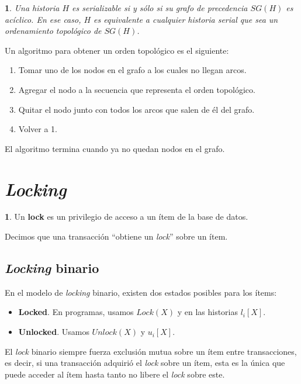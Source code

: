 \documentclass[english]{article}
\newtheorem{thm}{\protect\theoremname}
\theoremstyle{definition}
\theoremstyle{definition}
\newtheorem*{defn*}{\protect\definitionname}
\providecommand{\definitionname}{Definición}
\providecommand{\theoremname}{Teorema}
\begin{document}
\begin{thm}
Una historia $H$ es serializable si y sólo si su grafo de precedencia $SG(H)$
es acíclico. En ese caso, $H$ es equivalente a cualquier historia serial que
sea un ordenamiento topológico de $SG(H)$.
\end{thm}

Un algoritmo para obtener un orden topológico es el siguiente:

\begin{enumerate}
    \item Tomar uno de los nodos en el grafo a los cuales no llegan arcos.
    \item Agregar el nodo a la secuencia que representa el orden topológico.
    \item Quitar el nodo junto con todos los arcos que salen de él del grafo.
    \item Volver a 1.
\end{enumerate}

El algoritmo termina cuando ya no quedan nodos en el grafo.

\section{\emph{Locking}}

\begin{defn*}
Un \textbf{lock} es un privilegio de acceso a un ítem de la base de datos.
\end{defn*}

Decimos que una transacción ``obtiene un \emph{lock}'' sobre un ítem.

\subsection{\emph{Locking} binario}

En el modelo de \emph{locking} binario, existen dos estados posibles para los
ítems:

\begin{itemize}
    \item \textbf{Locked}. En programas, usamos $Lock(X)$ y en las historias
        $l_i[X]$.
    \item \textbf{Unlocked}. Usamos $Unlock(X)$ y $u_i[X]$.
\end{itemize}

El \emph{lock} binario siempre fuerza exclusión mutua sobre un ítem entre
transacciones, es decir, si una transacción adquirió el \emph{lock} sobre un
ítem, esta es la única que puede acceder al ítem hasta tanto no libere el
\emph{lock} sobre este.
\end{document}
